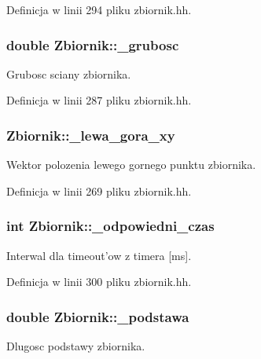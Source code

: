 Definicja w linii 294 pliku zbiornik.\-hh.

\hypertarget{class_zbiornik_a8a1db6d1edbfaa1a4f84d9717a8c0dfc}{
\subsubsection[{\-\_\-grubosc}]{\setlength{\rightskip}{0pt plus 5cm}double Zbiornik\-::\-\_\-grubosc\hspace{0.3cm}{\ttfamily [private]}}}\label{class_zbiornik_a8a1db6d1edbfaa1a4f84d9717a8c0dfc}
Grubosc sciany zbiornika. 

Definicja w linii 287 pliku zbiornik.\-hh.

\hypertarget{class_zbiornik_aab83049b3afbd20e1f158daf16e17e87}{
\subsubsection[{\-\_\-lewa\-\_\-gora\-\_\-xy}]{ Zbiornik\-::\-\_\-lewa\-\_\-gora\-\_\-xy\hspace{0.3cm}{\ttfamily [private]}}}\label{class_zbiornik_aab83049b3afbd20e1f158daf16e17e87}
Wektor polozenia lewego gornego punktu zbiornika. 

Definicja w linii 269 pliku zbiornik.\-hh.

\hypertarget{class_zbiornik_a14cf0ec861fc38fe40081342ef1e00df}{
\subsubsection[{\-\_\-odpowiedni\-\_\-czas}]{\setlength{\rightskip}{0pt plus 5cm}int Zbiornik\-::\-\_\-odpowiedni\-\_\-czas\hspace{0.3cm}{\ttfamily [private]}}}\label{class_zbiornik_a14cf0ec861fc38fe40081342ef1e00df}
Interwal dla timeout'ow z timera \mbox{[}ms\mbox{]}. 

Definicja w linii 300 pliku zbiornik.\-hh.

\hypertarget{class_zbiornik_aff57d3fb370566986df4eb58711cbfae}{
\subsubsection[{\-\_\-podstawa}]{\setlength{\rightskip}{0pt plus 5cm}double Zbiornik\-::\-\_\-podstawa\hspace{0.3cm}{\ttfamily [private]}}}\label{class_zbiornik_aff57d3fb370566986df4eb58711cbfae}
Dlugosc podstawy zbiornika. 

